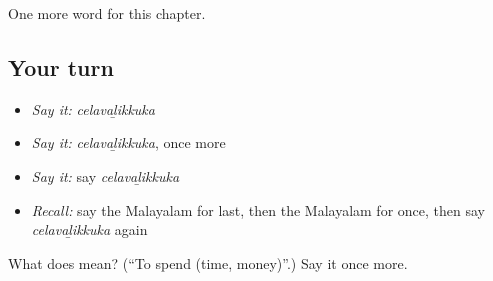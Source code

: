 \begin{grammarlens}[title={What you've built}]
One more word for this chapter.
\end{grammarlens}

\subsection*{Your turn}
\begin{itemize}
\raggedright
  \item \emph{Say it:} \emph{celavaḻikkuka}
  \item \emph{Say it:} \emph{celavaḻikkuka}, once more
  \item \emph{Say it:} say \emph{celavaḻikkuka}
  \item \emph{Recall:} say the Malayalam for last, then the Malayalam for once, then say \emph{celavaḻikkuka} again
\end{itemize}

\begin{tcolorbox}[breakable,colback=teal!4,colframe=teal!35!black,title={Before you move on}]
What does  mean? (\textquotedblleft{}To spend (time, money)\textquotedblright{}.) Say it once more.
\end{tcolorbox}
